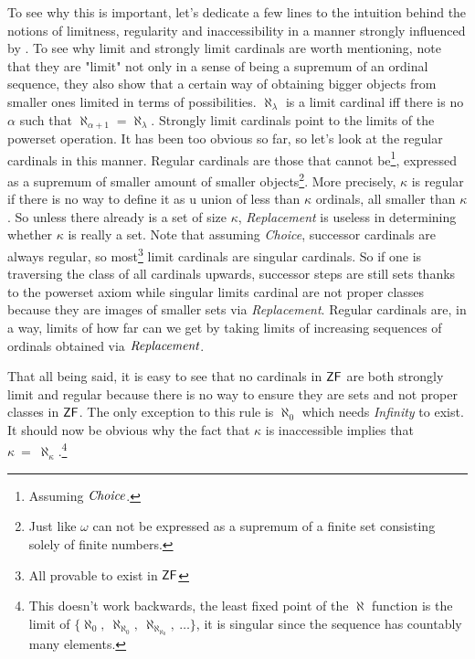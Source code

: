\documentclass[12pt,a4paper]{article}
\begin{document}
To see why this is important, let's dedicate a few lines to the intuition behind the notions of limitness, regularity and inaccessibility in a manner strongly influenced by \cite{Infinity_in_mind}. To see why limit and strongly limit cardinals are worth mentioning, note that they are "limit" not only in a sense of being a supremum of an ordinal sequence, they also show that a certain way of obtaining bigger objects from smaller ones limited in terms of possibilities. $\aleph_\lambda$ is a limit cardinal iff there is no $\alpha$ such that $\aleph_{\alpha+1}=\aleph_\lambda$. Strongly limit cardinals point to the limits of the powerset operation. It has been too obvious so far, so let's look at the regular cardinals in this manner. Regular cardinals are those that cannot be\footnote{Assuming $\emph{Choice}$.}, expressed as a supremum of smaller amount of smaller objects\footnote{Just like $\omega$ can not be expressed as a supremum of a finite set consisting solely of finite numbers.}. More precisely, $\kappa$ is regular if there is no way to define it as u union of less than $\kappa$ ordinals, all smaller than $\kappa$. So unless there already is a set of size $\kappa$, \emph{Replacement} is useless in determining whether $\kappa$ is really a set. Note that assuming \emph{Choice}, successor cardinals are always regular, so most\footnote{All provable to exist in $\sf{ZF}$} limit cardinals are singular cardinals. So if one is traversing the class of all cardinals upwards, successor steps are still sets thanks to the powerset axiom while singular limits cardinal are not proper classes because they are images of smaller sets via \emph{Replacement}. Regular cardinals are, in a way, limits of how far can we get by taking limits of increasing sequences of ordinals obtained via $\emph{Replacement}$.

That all being said, it is easy to see that no cardinals in $\sf{ZF}$ are both strongly limit and regular because there is no way to ensure they are sets and not proper classes in $\sf{ZF}$. The only exception to this rule is $\aleph_0$ which needs \emph{Infinity} to exist. %
It should now be obvious why the fact that $\kappa$ is inaccessible implies that $\kappa\ =\ \aleph_\kappa$.\footnote{This doesn't work backwards, the least fixed point of the $\aleph$ function is the limit of $\{\aleph_0,\ \aleph_{\aleph_0},\ \aleph_{\aleph_{\aleph_0}},\ \ldots \}$, it is singular since the sequence has countably many elements.}
\end{document}
